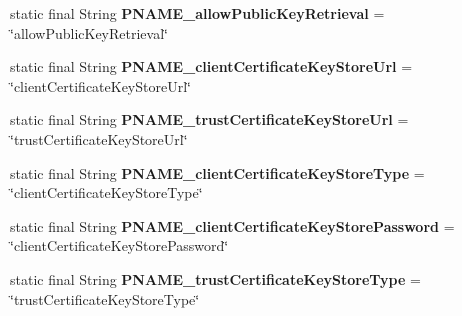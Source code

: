 \begin{DoxyCompactItemize}
\item 
\mbox{\label{classcom_1_1mysql_1_1cj_1_1conf_1_1_property_definitions_a7707cc2bba3c5e72218d6d645265193c}} 
static final String {\bfseries P\+N\+A\+M\+E\+\_\+allow\+Public\+Key\+Retrieval} = \char`\"{}allow\+Public\+Key\+Retrieval\char`\"{}
\item 
\mbox{\label{classcom_1_1mysql_1_1cj_1_1conf_1_1_property_definitions_a5f533e8d47c8d8d9f7c044c9699f3ac8}} 
static final String {\bfseries P\+N\+A\+M\+E\+\_\+client\+Certificate\+Key\+Store\+Url} = \char`\"{}client\+Certificate\+Key\+Store\+Url\char`\"{}
\item 
\mbox{\label{classcom_1_1mysql_1_1cj_1_1conf_1_1_property_definitions_a1b4cad2e4eae50e7ba78db25bd09d898}} 
static final String {\bfseries P\+N\+A\+M\+E\+\_\+trust\+Certificate\+Key\+Store\+Url} = \char`\"{}trust\+Certificate\+Key\+Store\+Url\char`\"{}
\item 
\mbox{\label{classcom_1_1mysql_1_1cj_1_1conf_1_1_property_definitions_a0f95e748247b281ecf5dd431e165ec71}} 
static final String {\bfseries P\+N\+A\+M\+E\+\_\+client\+Certificate\+Key\+Store\+Type} = \char`\"{}client\+Certificate\+Key\+Store\+Type\char`\"{}
\item 
\mbox{\label{classcom_1_1mysql_1_1cj_1_1conf_1_1_property_definitions_ab785e27a41b8e973499d5c8e8752a30d}} 
static final String {\bfseries P\+N\+A\+M\+E\+\_\+client\+Certificate\+Key\+Store\+Password} = \char`\"{}client\+Certificate\+Key\+Store\+Password\char`\"{}
\item 
\mbox{\label{classcom_1_1mysql_1_1cj_1_1conf_1_1_property_definitions_a1f43b71666a5d3055ea4ed0325a418ea}} 
static final String {\bfseries P\+N\+A\+M\+E\+\_\+trust\+Certificate\+Key\+Store\+Type} = \char`\"{}trust\+Certificate\+Key\+Store\+Type\char`\"{}
\item 
\mbox{\label{classcom_1_1mysql_1_1cj_1_1conf_1_1_property_definitions_ad61e9d477ceeb3d8b4bc4b13bd59a0d0}} 

\end{DoxyCompactItemize}
